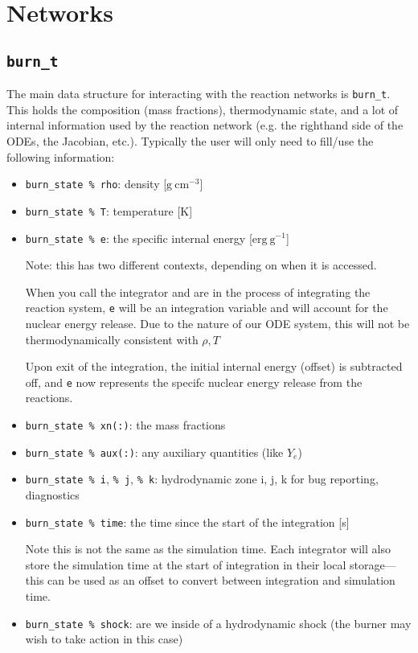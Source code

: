 \section{Networks}

\subsection{{\tt burn\_t}}

The main data structure for interacting with the reaction networks is
{\tt burn\_t}.  This holds the composition (mass fractions),
thermodynamic state, and a lot of internal information used by the
reaction network (e.g. the righthand side of the ODEs, the Jacobian,
etc.).  Typically the user will only need to fill/use the following
information:
\begin{itemize}
\item {\tt burn\_state \% rho}: density [$\mathrm{g~cm^{-3}}$]

\item {\tt burn\_state \% T}: temperature [K]

\item {\tt burn\_state \% e}: the specific internal energy [$\mathrm{erg~g^{-1}}$]

  Note: this has two different contexts, depending on when it is
  accessed.

  When you call the integrator and are in the process of integrating
  the reaction system, {\tt e} will be an integration variable and
  will account for the nuclear energy release.  Due to the nature 
  of our ODE system, this will not be thermodynamically consistent with
  $\rho, T$

  Upon exit of the integration, the initial internal energy (offset)
  is subtracted off, and {\tt e} now represents the specifc nuclear
  energy release from the reactions.
  

\item {\tt burn\_state \% xn(:)}: the mass fractions

\item {\tt burn\_state \% aux(:)}: any auxiliary quantities (like $Y_e$)

\item {\tt burn\_state \% i}, {\tt \% j}, {\tt \% k}: hydrodynamic zone i, j, k for
  bug reporting, diagnostics

\item {\tt burn\_state \% time}: the time since the start of the
  integration [s]

  Note this is not the same as the simulation time.  Each integrator
  will also store the simulation time at the start of integration
  in their local storage---this can be used as an offset to convert
  between integration and simulation time.

\item {\tt burn\_state \% shock}: are we inside of a hydrodynamic shock (the burner
  may wish to take action in this case)

\end{itemize}


